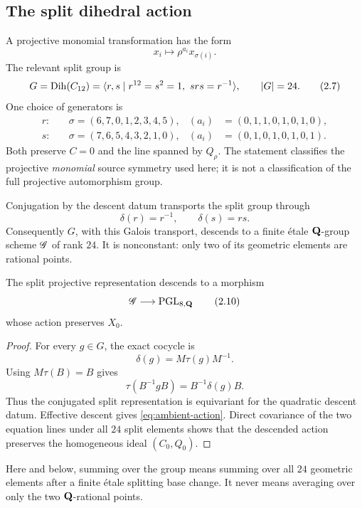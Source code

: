 \subsection{The split dihedral action}

A projective monomial transformation has the form
\[
 x_i\longmapsto \rho^{a_i}x_{\sigma(i)}.
\]
The relevant split group is
\[
 G=\operatorname{Dih}(C_{12})
 =\langle r,s\mid r^{12}=s^2=1,\ srs=r^{-1}\rangle,
 \qquad |G|=24.                                    \tag{2.7}
\]
One choice of generators is
\[
\begin{aligned}
r:&\quad \sigma=(6,7,0,1,2,3,4,5),&
(a_i)&=(0,1,1,0,1,0,1,0),\\
s:&\quad \sigma=(7,6,5,4,3,2,1,0),&
(a_i)&=(0,1,0,1,0,1,0,1).
\end{aligned}                                      \tag{2.8}
\]
Both preserve \(C=0\) and the line spanned by \(Q_\rho\).  The statement
classifies the projective \emph{monomial} source symmetry used here; it is
not a classification of the full projective automorphism group.

Conjugation by the descent datum transports the split group through
\[
 \delta(r)=r^{-1},\qquad \delta(s)=rs.              \tag{2.9}
\]
Consequently \(G\), with this Galois transport, descends to a finite
\'etale \(\mathbf Q\)-group scheme \(\mathscr G\) of rank \(24\).  It is
nonconstant: only two of its geometric elements are rational points.

\begin{lemma}
\label{lem:ambient-descent}
The split projective representation descends to a morphism
\[
 \mathscr G\longrightarrow\operatorname{PGL}_{8,\mathbf Q}
\tag{2.10}
\label{eq:ambient-action}
\]
whose action preserves \(X_0\).
\end{lemma}

\begin{proof}
For every \(g\in G\), the exact cocycle is
\[
 \delta(g)=M\tau(g)M^{-1}.
\]
Using \(M\tau(B)=B\) gives
\[
 \tau(B^{-1}gB)=B^{-1}\delta(g)B.                  \tag{2.11}
\]
Thus the conjugated split representation is equivariant for the quadratic
descent datum.  Effective descent gives \cref{eq:ambient-action}.  Direct
covariance of the two equation lines under all \(24\) split elements shows
that the descended action preserves the homogeneous ideal
\((C_0,Q_0)\).
\end{proof}

Here and below, summing over the group means summing over all \(24\)
geometric elements after a finite \'etale splitting base change.  It never
means averaging over only the two \(\mathbf Q\)-rational points.
